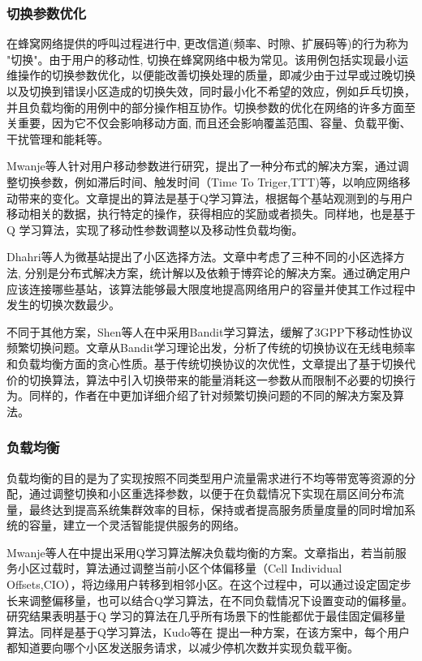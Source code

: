\documentclass{IEEEtran}
\begin{document}
\subsubsection{切换参数优化}
在蜂窝网络提供的呼叫过程进行中, 更改信道(频率、时隙、扩展码等)的行为称为 "切换"。由于用户的移动性, 切换在蜂窝网络中极为常见。该用例包括实现最小运维操作的切换参数优化，以便能改善切换处理的质量，即减少由于过早或过晚切换以及切换到错误小区造成的切换失效，同时最小化不希望的效应，例如乒乓切换，并且负载均衡的用例中的部分操作相互协作。切换参数的优化在网络的许多方面至关重要，因为它不仅会影响移动方面, 而且还会影响覆盖范围、容量、负载平衡、干扰管理和能耗等。


Mwanje等人\cite{Mwanje2014}针对用户移动参数进行研究，提出了一种分布式的解决方案，通过调整切换参数，例如滞后时间、触发时间（Time To Triger,TTT)等，以响应网络移动带来的变化。文章提出的算法是基于Q学习算法，根据每个基站观测到的与用户移动相关的数据，执行特定的操作，获得相应的奖励或者损失。同样地，\cite{Mwanje2013}也是基于Q 学习算法，实现了移动性参数调整以及移动性负载均衡。

Dhahri等人\cite{Dhahri2014}为微基站提出了小区选择方法。文章中考虑了三种不同的小区选择方法, 分别是分布式解决方案，统计解以及依赖于博弈论的解决方案。通过确定用户应该连接哪些基站，该算法能够最大限度地提高网络用户的容量并使其工作过程中发生的切换次数最少。

不同于其他方案，Shen等人在\cite{Shen2017}中采用Bandit学习算法，缓解了3GPP下移动性协议频繁切换问题。文章从Bandit学习理论出发，分析了传统的切换协议在无线电频率和负载均衡方面的贪心性质。基于传统切换协议的次优性，文章提出了基于切换代价的切换算法，算法中引入切换带来的能量消耗这一参数从而限制不必要的切换行为。同样的，作者在\cite{Shen2016}中更加详细介绍了针对频繁切换问题的不同的解决方案及算法。

\subsubsection{负载均衡}

负载均衡的目的是为了实现按照不同类型用户流量需求进行不均等带宽等资源的分配，通过调整切换和小区重选择参数，以便于在负载情况下实现在扇区间分布流量，最终达到提高系统集群效率的目标，保持或者提高服务质量度量的同时增加系统的容量，建立一个灵活智能提供服务的网络。


Mwanje等人在\cite{Mwanje2013}中提出采用Q学习算法解决负载均衡的方案。文章指出，若当前服务小区过载时，算法通过调整当前小区个体偏移量（Cell Individual Offsets,CIO），将边缘用户转移到相邻小区。在这个过程中，可以通过设定固定步长来调整偏移量，也可以结合Q学习算法，在不同负载情况下设置变动的偏移量。研究结果表明基于Q 学习的算法在几乎所有场景下的性能都优于最佳固定偏移量算法。同样是基于Q学习算法，Kudo等在\cite{Kudo2014} 提出一种方案，在该方案中，每个用户都知道要向哪个小区发送服务请求，以减少停机次数并实现负载平衡。
\end{document}
